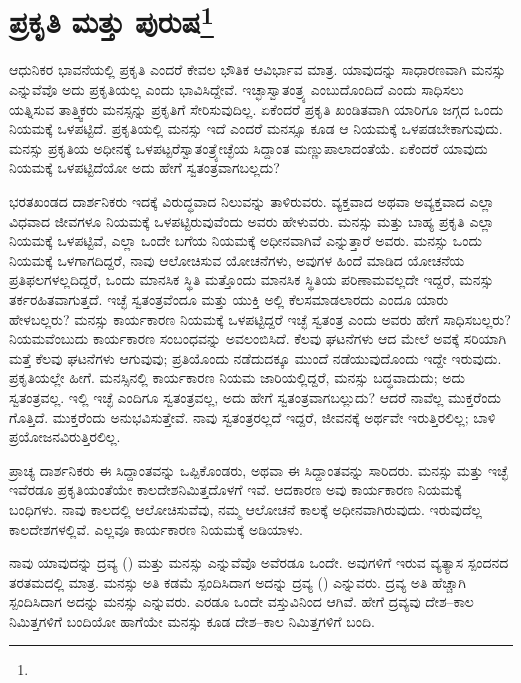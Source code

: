 
\chapter[ಪ್ರಕೃತಿ ಮತ್ತು ಪುರುಷ]{ಪ್ರಕೃತಿ ಮತ್ತು ಪುರುಷ\protect\footnote{}}

ಆಧುನಿಕರ ಭಾವನೆಯಲ್ಲಿ ಪ್ರಕೃತಿ ಎಂದರೆ ಕೇವಲ ಭೌತಿಕ ಆವಿರ್ಭಾವ ಮಾತ್ರ. ಯಾವುದನ್ನು ಸಾಧಾರಣವಾಗಿ ಮನಸ್ಸು ಎನ್ನುವೆವೊ ಅದು ಪ್ರಕೃತಿಯಲ್ಲ ಎಂದು ಭಾವಿಸಿದ್ದೇವೆ. ಇಚ್ಛಾಸ್ವಾತಂತ್ರ್ಯ ಎಂಬುದೊಂದಿದೆ ಎಂದು ಸಾಧಿಸಲು ಯತ್ನಿಸುವ ತಾತ್ತ್ವಿಕರು ಮನಸ್ಸನ್ನು ಪ್ರಕೃತಿಗೆ ಸೇರಿಸುವುದಿಲ್ಲ. ಏಕೆಂದರೆ ಪ್ರಕೃತಿ ಖಂಡಿತವಾಗಿ ಯಾರಿಗೂ ಜಗ್ಗದ ಒಂದು ನಿಯಮಕ್ಕೆ ಒಳಪಟ್ಟಿದೆ. ಪ್ರಕೃತಿಯಲ್ಲಿ ಮನಸ್ಸು ಇದೆ ಎಂದರೆ ಮನಸ್ಸೂ ಕೂಡ ಆ ನಿಯಮಕ್ಕೆ ಒಳಪಡಬೇಕಾಗುವುದು. ಮನಸ್ಸು ಪ್ರಕೃತಿಯ ಅಧೀನಕ್ಕೆ ಒಳಪಟ್ಟರೆ\break ಸ್ವಾತಂತ್ರ್ಯೇಚ್ಛೆಯ ಸಿದ್ದಾಂತ ಮಣ್ಣುಪಾಲಾದಂತೆಯೆ. ಏಕೆಂದರೆ ಯಾವುದು ನಿಯಮಕ್ಕೆ ಒಳಪಟ್ಟಿದೆಯೋ ಅದು ಹೇಗೆ ಸ್ವತಂತ್ರವಾಗಬಲ್ಲದು?

ಭರತಖಂಡದ ದಾರ್ಶನಿಕರು ಇದಕ್ಕೆ ವಿರುದ್ಧವಾದ ನಿಲುವನ್ನು ತಾಳಿರುವರು. ವ್ಯಕ್ತವಾದ ಅಥವಾ ಅವ್ಯಕ್ತವಾದ ಎಲ್ಲಾ ವಿಧವಾದ ಜೀವಗಳೂ ನಿಯಮಕ್ಕೆ ಒಳಪಟ್ಟಿರುವುವೆಂದು ಅವರು ಹೇಳುವರು. ಮನಸ್ಸು ಮತ್ತು ಬಾಹ್ಯ ಪ್ರಕೃತಿ ಎಲ್ಲಾ ನಿಯಮಕ್ಕೆ ಒಳಪಟ್ಟಿವೆ, ಎಲ್ಲಾ ಒಂದೇ ಬಗೆಯ ನಿಯಮಕ್ಕೆ ಅಧೀನವಾಗಿವೆ ಎನ್ನುತ್ತಾರೆ ಅವರು. ಮನಸ್ಸು ಒಂದು ನಿಯಮಕ್ಕೆ ಒಳಗಾಗದಿದ್ದರೆ, ನಾವು ಆಲೋಚಿಸುವ ಯೋಚನೆಗಳು, ಅವುಗಳ ಹಿಂದೆ ಮಾಡಿದ ಯೋಚನೆಯ ಪ್ರತಿಫಲಗಳಲ್ಲದಿದ್ದರೆ, ಒಂದು ಮಾನಸಿಕ ಸ್ಥಿತಿ ಮತ್ತೊಂದು ಮಾನಸಿಕ ಸ್ಥಿತಿಯ ಪರಿಣಾಮವಲ್ಲದೇ ಇದ್ದರೆ, ಮನಸ್ಸು ತರ್ಕರಹಿತವಾಗುತ್ತದೆ. ಇಚ್ಛೆ ಸ್ವತಂತ್ರವೆಂದೂ ಮತ್ತು ಯುಕ್ತಿ ಅಲ್ಲಿ ಕೆಲಸಮಾಡಲಾರದು ಎಂದೂ ಯಾರು ಹೇಳಬಲ್ಲರು? ಮನಸ್ಸು ಕಾರ್ಯಕಾರಣ ನಿಯಮಕ್ಕೆ ಒಳಪಟ್ಟಿದ್ದರೆ ಇಚ್ಛೆ ಸ್ವತಂತ್ರ ಎಂದು ಅವರು ಹೇಗೆ ಸಾಧಿಸಬಲ್ಲರು? ನಿಯಮವೆಂಬುದು ಕಾರ್ಯಕಾರಣ ಸಂಬಂಧವನ್ನು ಅವಲಂಬಿಸಿದೆ. ಕೆಲವು ಘಟನೆಗಳು ಆದ ಮೇಲೆ ಅವಕ್ಕೆ ಸರಿಯಾಗಿ ಮತ್ತೆ ಕೆಲವು ಘಟನೆಗಳು ಆಗುವುವು; ಪ್ರತಿಯೊಂದು ನಡೆದುದಕ್ಕೂ ಮುಂದೆ ನಡೆಯುವುದೊಂದು ಇದ್ದೇ ಇರುವುದು. ಪ್ರಕೃತಿಯಲ್ಲೇ ಹೀಗೆ. ಮನಸ್ಸಿನಲ್ಲಿ ಕಾರ್ಯಕಾರಣ ನಿಯಮ ಜಾರಿಯಲ್ಲಿದ್ದರೆ, ಮನಸ್ಸು ಬದ್ಧವಾದುದು; ಅದು ಸ್ವತಂತ್ರವಲ್ಲ. ಇಲ್ಲಿ ಇಚ್ಛೆ ಎಂದಿಗೂ ಸ್ವತಂತ್ರವಲ್ಲ, ಅದು ಹೇಗೆ ಸ್ವತಂತ್ರವಾಗಬಲ್ಲುದು? ಆದರೆ ನಾವೆಲ್ಲ ಮುಕ್ತರೆಂದು ಗೊತ್ತಿದೆ. ಮುಕ್ತರೆಂದು ಅನುಭವಿಸುತ್ತೇವೆ. ನಾವು ಸ್ವತಂತ್ರರಲ್ಲದೆ ಇದ್ದರೆ, ಜೀವನಕ್ಕೆ ಅರ್ಥವೇ ಇರುತ್ತಿರಲಿಲ್ಲ; ಬಾಳಿ ಪ್ರಯೋಜನವಿರುತ್ತಿರಲಿಲ್ಲ.

ಪ್ರಾಚ್ಯ ದಾರ್ಶನಿಕರು ಈ ಸಿದ್ದಾಂತವನ್ನು ಒಪ್ಪಿಕೊಂಡರು, ಅಥವಾ ಈ ಸಿದ್ದಾಂತವನ್ನು ಸಾರಿದರು. ಮನಸ್ಸು ಮತ್ತು ಇಚ್ಛೆ ಇವೆರಡೂ ಪ್ರಕೃತಿಯಂತೆಯೇ ಕಾಲದೇಶನಿಮಿತ್ತದೊಳಗೆ ಇವೆ. ಆದಕಾರಣ ಅವು ಕಾರ್ಯಕಾರಣ ನಿಯಮಕ್ಕೆ ಬಂಧಿಗಳು. ನಾವು ಕಾಲದಲ್ಲಿ ಆಲೋಚಿಸುವೆವು, ನಮ್ಮ ಆಲೋಚನೆ ಕಾಲಕ್ಕೆ ಅಧೀನವಾಗಿರುವುದು. ಇರುವುದೆಲ್ಲ ಕಾಲದೇಶಗಳಲ್ಲಿವೆ. ಎಲ್ಲವೂ ಕಾರ್ಯಕಾರಣ ನಿಯಮಕ್ಕೆ ಅಡಿಯಾಳು.

ನಾವು ಯಾವುದನ್ನು ದ್ರವ್ಯ () ಮತ್ತು ಮನಸ್ಸು ಎನ್ನುವೆವೊ ಅವೆರಡೂ ಒಂದೇ. ಅವುಗಳಿಗೆ ಇರುವ ವ್ಯತ್ಯಾಸ ಸ್ಪಂದನದ ತರತಮದಲ್ಲಿ ಮಾತ್ರ. ಮನಸ್ಸು ಅತಿ ಕಡಮೆ ಸ್ಪಂದಿಸಿದಾಗ ಅದನ್ನು ದ್ರವ್ಯ () ಎನ್ನುವರು. ದ್ರವ್ಯ ಅತಿ ಹೆಚ್ಚಾಗಿ ಸ್ಪಂದಿಸಿದಾಗ ಅದನ್ನು ಮನಸ್ಸು ಎನ್ನುವರು. ಎರಡೂ ಒಂದೇ ವಸ್ತುವಿನಿಂದ ಆಗಿವೆ. ಹೇಗೆ ದ್ರವ್ಯವು ದೇಶ–ಕಾಲ ನಿಮಿತ್ತಗಳಿಗೆ ಬಂದಿಯೋ ಹಾಗೆಯೇ ಮನಸ್ಸು ಕೂಡ ದೇಶ–ಕಾಲ ನಿಮಿತ್ತಗಳಿಗೆ ಬಂದಿ.

